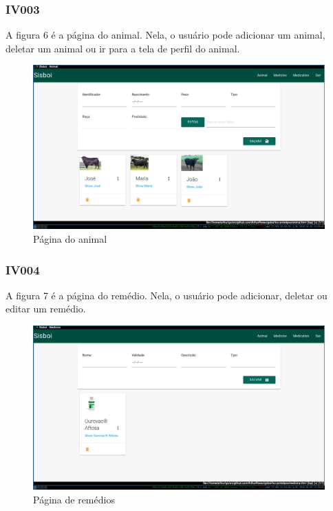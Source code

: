 \documentclass[12pt]{article}
\begin{document}
\begin{titlepage}
\begin{center}
\begin{figure}[!h]
\begin{center}

	\end{center}
\end{figure}

\newpage
\subsubsection{IV003}

A figura 6 é a página do animal. Nela, o usuário pode adicionar um animal, deletar um animal ou ir para a tela de perfil do animal.
\begin{figure}[!h]
	\begin{center}
		\caption{Página do animal}
		\includegraphics[width=13cm]{img/prototipos/animal.png}


	\end{center}
\end{figure}
\subsubsection{IV004}

A figura 7 é a página do remédio. Nela, o usuário pode adicionar, deletar ou editar um remédio.
\begin{figure}[!h]
	\begin{center}
		\caption{Página de remédios}
		\includegraphics[width=13cm]{img/prototipos/remedio.png}


\end{center}
\end{figure}
\end{center}
\end{titlepage}
\end{document}
